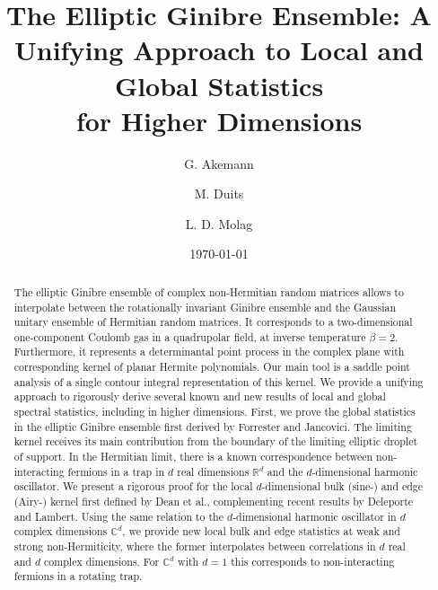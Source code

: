 \documentclass[%
 jmp,
cp,  %
 amsmath,amsthm,amssymb,%
 reprint,%
onecolumn]{revtex4-2}
\begin{document}
\title{The Elliptic Ginibre Ensemble: A Unifying Approach to Local and Global Statistics\\ for Higher Dimensions}%

\author{G. Akemann} %
\author{M. Duits}%

\author{L. D. Molag}
%

\date{\today} %

\begin{abstract}
The elliptic Ginibre ensemble of complex non-Hermitian random matrices allows to interpolate between the rotationally invariant Ginibre ensemble and the Gaussian unitary ensemble of Hermitian random matrices. It corresponds to a two-dimensional one-component Coulomb gas in a quadrupolar field, at inverse temperature $\beta=2$. Furthermore, it represents a determinantal point process in the complex plane with corresponding kernel of planar Hermite polynomials. Our main tool is a saddle point analysis of a single contour integral representation of this kernel. 
We provide a unifying approach to rigorously derive several known and new results of local and global spectral statistics, including in higher dimensions. 
First, we prove the global statistics in the elliptic Ginibre ensemble first derived by Forrester and Jancovici. The limiting kernel receives its main contribution from the boundary of the limiting elliptic droplet of support. In the Hermitian limit, there is a known correspondence between non-interacting fermions in a trap in $d$ real dimensions $\mathbb{R}^d$ and the $d$-dimensional harmonic oscillator. We present a rigorous proof for the local $d$-dimensional bulk (sine-) and edge (Airy-) kernel first defined by Dean et al., complementing recent results by Deleporte and Lambert. 
Using the same relation to the $d$-dimensional harmonic oscillator in  $d$ complex dimensions $\mathbb{C}^d$, we provide new local bulk and edge statistics at weak and strong non-Hermiticity, where the former interpolates between correlations in $d$ real and $d$ complex dimensions. For $\mathbb{C}^d$ with $d=1$ this corresponds to non-interacting fermions in a rotating trap.
\end{abstract}
\end{document}
